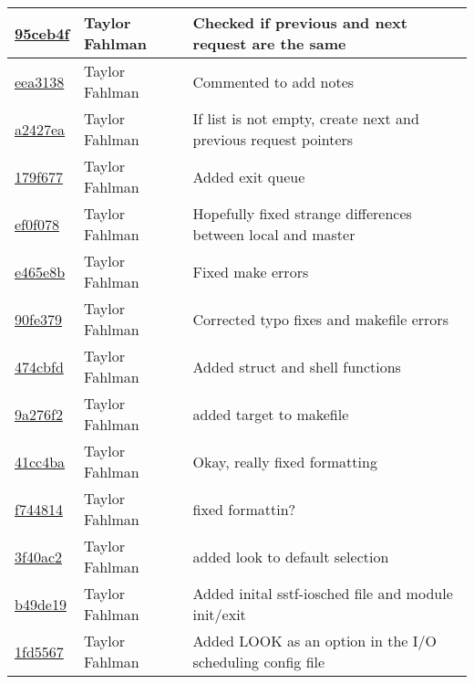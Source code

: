 \begin{tabular}{l l l}
\href{git@github.com:fahlmant/cs444/commit/95ceb4f9438107951331d241099b020416a2e580}{95ceb4f} & Taylor Fahlman & Checked if previous and next request are the same\\\hline
\href{git@github.com:fahlmant/cs444/commit/eea31387ddd4b439198607910a6025a957d4ce2b}{eea3138} & Taylor Fahlman & Commented to add notes\\\hline
\href{git@github.com:fahlmant/cs444/commit/a2427eaa94cfc72c3c636d359e1ff18729c50803}{a2427ea} & Taylor Fahlman & If list is not empty, create next and previous request pointers\\\hline
\href{git@github.com:fahlmant/cs444/commit/179f677a63ce6e59233d66e1696cc2a2c6da4f94}{179f677} & Taylor Fahlman & Added exit queue\\\hline
\href{git@github.com:fahlmant/cs444/commit/ef0f078626f6b3779db8239cfadefc9b0eb57422}{ef0f078} & Taylor Fahlman & Hopefully fixed strange differences between local and master\\\hline
\href{git@github.com:fahlmant/cs444/commit/e465e8bca4a176e46eec39c9506fcbbeaa52346d}{e465e8b} & Taylor Fahlman & Fixed make errors\\\hline
\href{git@github.com:fahlmant/cs444/commit/90fe379dcec284aec20892a7b5dfed7418d1f629}{90fe379} & Taylor Fahlman & Corrected typo fixes and makefile errors\\\hline
\href{git@github.com:fahlmant/cs444/commit/474cbfd6cf240364ec4739b91d21f0a08efa0507}{474cbfd} & Taylor Fahlman & Added struct and shell functions\\\hline
\href{git@github.com:fahlmant/cs444/commit/9a276f27141dec3a008c5ff9b3f53302579d55dc}{9a276f2} & Taylor Fahlman & added target to makefile\\\hline
\href{git@github.com:fahlmant/cs444/commit/41cc4baab6306e573e7cebb13ab23eba9ee28942}{41cc4ba} & Taylor Fahlman & Okay, really fixed formatting\\\hline
\href{git@github.com:fahlmant/cs444/commit/f744814a5f73441d92f08e7ec4c1734b8effe233}{f744814} & Taylor Fahlman & fixed formattin?\\\hline
\href{git@github.com:fahlmant/cs444/commit/3f40ac2f576b2250e924524e3c7973a7b57b99dc}{3f40ac2} & Taylor Fahlman & added look to default selection\\\hline
\href{git@github.com:fahlmant/cs444/commit/b49de190dda284a50bb2738f40b8436171b9d691}{b49de19} & Taylor Fahlman & Added inital sstf-iosched file and module init/exit\\\hline
\href{git@github.com:fahlmant/cs444/commit/1fd55679562034d28fcfbb6e2ac1642c5c88dfc9}{1fd5567} & Taylor Fahlman & Added LOOK as an option in the I/O scheduling config file\\\hline

\end{tabular}
